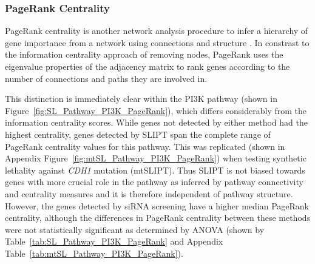 \begin{table*}[!htb]
\caption{\gls{ANOVA} for Synthetic Lethality and Information Centrality}
\label{tab:SL_Pathway_PI3K_InfoCent}
\noindent{}
\end{table*} \filbreak

\FloatBarrier

\subsubsection{PageRank Centrality}  \label{chapt4:Network_PageRank}

\FloatBarrier

PageRank centrality is another network analysis procedure to infer a hierarchy of gene importance from a network using connections and structure \citep{Brin1998}. In constrast to the information centrality approach of removing nodes, PageRank uses the eigenvalue properties of the adjacency matrix to rank genes according to the number of connections and paths they are involved in. 

This distinction is immediately clear within the PI3K pathway (shown in Figure~\ref{fig:SL_Pathway_PI3K_PageRank}), which differs considerably from the information centrality scores. While genes not detected by either method had the highest centrality, genes detected by \gls{SLIPT} span the complete range of PageRank centrality values for this pathway. This was replicated (shown in Appendix Figure~\ref{fig:mtSL_Pathway_PI3K_PageRank}) when testing synthetic lethality against \textit{CDH1} mutation (mtSLIPT).  Thus \gls{SLIPT} is not biased towards genes with more crucial role in the pathway as inferred by pathway connectivity and centrality measures and it is therefore independent of pathway structure. However, the genes detected by \gls{siRNA} screening have a higher median PageRank centrality, although the differences in PageRank centrality between these methods were not statistically significant as determined by \gls{ANOVA} (shown by Table~\ref{tab:SL_Pathway_PI3K_PageRank} and Appendix Table~\ref{tab:mtSL_Pathway_PI3K_PageRank}).

